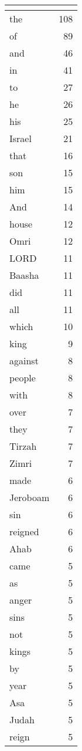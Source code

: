 \begin{center}
\begin{longtable}{l|r}
\hline \multicolumn{2}{c}{{ }} \\ \hline
\endfoot 
the & 108\\ \hline 
of & 89\\ \hline 
and & 46\\ \hline 
in & 41\\ \hline 
to & 27\\ \hline 
he & 26\\ \hline 
his & 25\\ \hline 
Israel & 21\\ \hline 
that & 16\\ \hline 
son & 15\\ \hline 
him & 15\\ \hline 
And & 14\\ \hline 
house & 12\\ \hline 
Omri & 12\\ \hline 
LORD & 11\\ \hline 
Baasha & 11\\ \hline 
did & 11\\ \hline 
all & 11\\ \hline 
which & 10\\ \hline 
king & 9\\ \hline 
against & 8\\ \hline 
people & 8\\ \hline 
with & 8\\ \hline 
over & 7\\ \hline 
they & 7\\ \hline 
Tirzah & 7\\ \hline 
Zimri & 7\\ \hline 
made & 6\\ \hline 
Jeroboam & 6\\ \hline 
sin & 6\\ \hline 
reigned & 6\\ \hline 
Ahab & 6\\ \hline 
came & 5\\ \hline 
as & 5\\ \hline 
anger & 5\\ \hline 
sins & 5\\ \hline 
not & 5\\ \hline 
kings & 5\\ \hline 
by & 5\\ \hline 
year & 5\\ \hline 
Asa & 5\\ \hline 
Judah & 5\\ \hline 
reign & 5\\ \hline 

\end{longtable}
\end{center}
